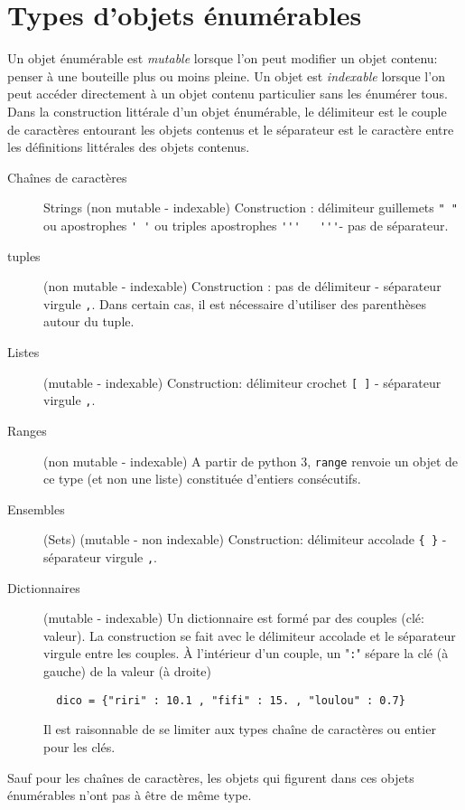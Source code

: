 \section{Types d'objets énumérables}
Un objet énumérable est \emph{mutable}  lorsque l'on peut modifier un objet contenu: penser à une bouteille plus ou moins pleine.\newline
Un objet est \emph{indexable}  lorsque l'on peut accéder directement à un objet contenu particulier sans les énumérer tous.\newline
Dans la construction littérale d'un objet énumérable, le délimiteur  est le couple de caractères entourant les objets contenus et le séparateur est le caractère entre les définitions littérales des objets contenus.
\begin{description}
 \item [Chaînes de caractères] Strings (non mutable - indexable) Construction : délimiteur guillemets \verb|" "| ou apostrophes \verb|' '| ou triples apostrophes \verb|'''   '''|- pas de séparateur.
 \item [tuples] (non mutable - indexable) Construction : pas de délimiteur - séparateur virgule \verb|,|. Dans certain cas, il est nécessaire d'utiliser des parenthèses autour du tuple.
 \item [Listes] (mutable - indexable) Construction: délimiteur crochet \verb|[ ]| - séparateur virgule \verb|,|.
 \item [Ranges] (non mutable - indexable) A partir de python 3, \texttt{range} renvoie un objet de ce type (et non une liste) constituée d'entiers consécutifs.
 \item [Ensembles] (Sets) (mutable - non indexable) Construction: délimiteur accolade \verb|{ }| - séparateur virgule \verb|,|.
 \item [Dictionnaires] (mutable - indexable) Un dictionnaire est formé par des couples (clé: valeur). La construction se fait avec le délimiteur accolade et le séparateur virgule entre les couples. \`A l'intérieur d'un couple, un "\verb|:|" sépare la clé (à gauche) de la valeur (à droite)
 \begin{verbatim}
  dico = {"riri" : 10.1 , "fifi" : 15. , "loulou" : 0.7} \end{verbatim}
 Il est raisonnable de se limiter aux types chaîne de caractères ou entier pour les clés.
\end{description}
Sauf pour les chaînes de caractères, les objets qui figurent dans ces objets énumérables n'ont pas à être de même type.\newline
